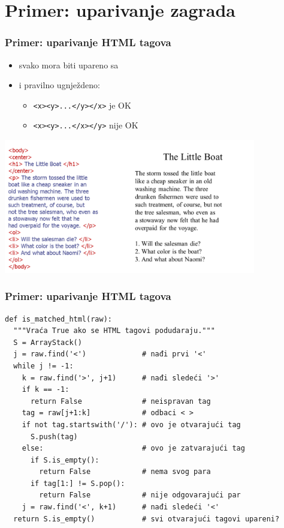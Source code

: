 \documentclass[compress]{beamer}
\begin{document}
\section[P: HTML]{Primer: uparivanje zagrada}
\begin{frame}[fragile,shrink=10]
  \frametitle{Primer: uparivanje HTML tagova}
  \begin{itemize}
    \item svako  mora biti upareno sa 
    \item i pravilno ugnježdeno:
    \begin{itemize}
      \item \texttt{<x><y>...</y></x>} je OK
      \item \texttt{<x><y>...</x></y>} nije OK
    \end{itemize}
  \end{itemize}
  \begin{center}
    \includegraphics[width=11cm]{asp-05-pic04.png}
  \end{center}
\end{frame}

\begin{frame}[fragile,shrink=10]
  \frametitle{Primer: uparivanje HTML tagova}
\begin{verbatim}
def is_matched_html(raw):
  """Vraća True ako se HTML tagovi podudaraju."""
  S = ArrayStack()
  j = raw.find('<')             # nađi prvi '<'
  while j != -1:
    k = raw.find('>', j+1)      # nađi sledeći '>'
    if k == -1:
      return False              # neispravan tag
    tag = raw[j+1:k]            # odbaci < >
    if not tag.startswith('/'): # ovo je otvarajući tag
      S.push(tag)
    else:                       # ovo je zatvarajući tag
      if S.is_empty():
        return False            # nema svog para
      if tag[1:] != S.pop():
        return False            # nije odgovarajući par
    j = raw.find('<', k+1)      # nađi sledeći '<'
  return S.is_empty()           # svi otvarajući tagovi upareni?
\end{verbatim}
\end{frame}
\end{document}
